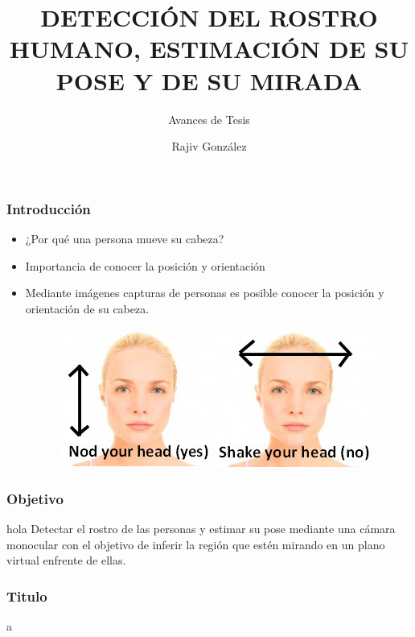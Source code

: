 \documentclass[10pt, compress]{beamer}
\title{\sc DETECCIÓN DEL ROSTRO HUMANO, ESTIMACIÓN DE SU POSE Y DE SU MIRADA}
\subtitle{Avances de Tesis}
\author{Rajiv González}
\institute{Maestría en Ciencias de la Computación, UADY}
\begin{document}
\maketitle

\begin{frame}[fragile]
	\frametitle{Introducción}
	\begin{itemize}
		\item ¿Por qué una persona mueve su cabeza?
		\item Importancia de conocer la posición y orientación
		\item Mediante imágenes capturas de personas es posible conocer la posición y orientación de su cabeza.

		\begin{figure}[htbp]
			\centering
			\includegraphics[width=.5\textwidth]{./pictures/nod}
		\end{figure}
	\end{itemize}

\end{frame}

\begin{frame}[fragile]
\frametitle{Objetivo}

  \begin{block}{hola}
  Detectar el rostro de las personas y estimar su pose mediante una cámara monocular con el objetivo de inferir la región que estén mirando en un plano virtual enfrente de ellas.
  \end{block}




\end{frame}
\begin{frame}[fragile]
\frametitle{Titulo}
a

\end{frame}
\end{document}
